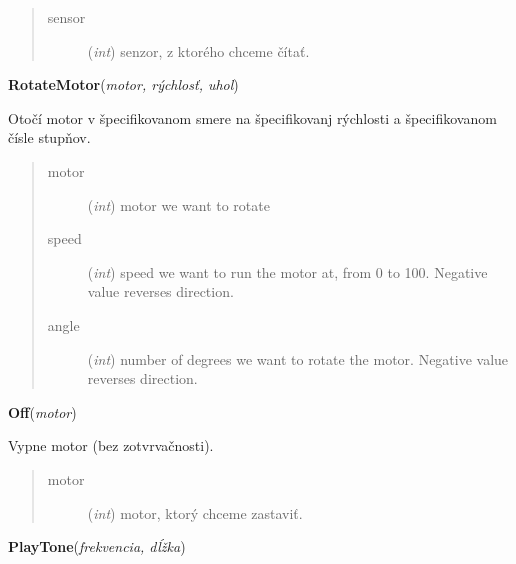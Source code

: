 \documentclass[10pt,a4paper]{article}
\begin{document}
    

\begin{quote}
    \begin{description}
        
\item[sensor] ({\emph{int}}) senzor, z ktorého chceme čítať.

    \end{description}
\end{quote}

 

\vspace{6pt}
{\bf RotateMotor}({\it motor, rýchlosť, uhol}) 
    
    Otočí motor v špecifikovanom smere na špecifikovanj rýchlosti a špecifikovanom čísle stupňov.




    

\begin{quote}
    \begin{description}
        
\item[motor] ({\emph{int}}) motor we want to rotate

\item[speed] ({\emph{int}}) speed we want to run the motor at, from 0 to 100. Negative value reverses direction.

\item[angle] ({\emph{int}}) number of degrees we want to rotate the motor. Negative value reverses direction.

    \end{description}
\end{quote}

 

\vspace{6pt}
{\bf Off}({\it motor}) 
    
    Vypne motor (bez zotvrvačnosti).
    

    

\begin{quote}
    \begin{description}
        
\item[motor] ({\emph{int}}) motor, ktorý chceme zastaviť.

    \end{description}
\end{quote}

 

\vspace{6pt}
{\bf PlayTone}({\it frekvencia, dĺžka}) 
    
\end{document}
